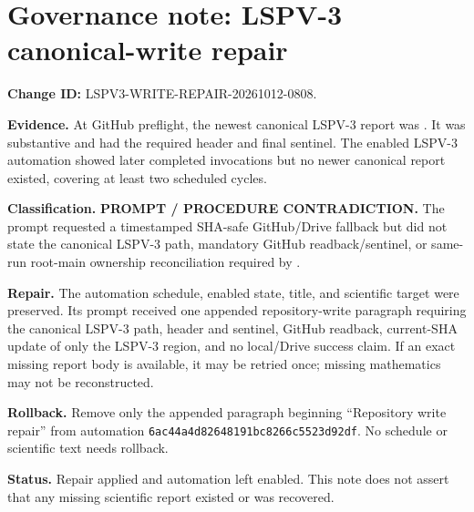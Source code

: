 \documentclass[11pt]{article}
\begin{document}
\section*{Governance note: LSPV-3 canonical-write repair}
\textbf{Change ID:} LSPV3-WRITE-REPAIR-20261012-0808.

\textbf{Evidence.} At GitHub preflight, the newest canonical LSPV-3 report
was .
It was substantive and had the required header and final sentinel.  The
enabled LSPV-3 automation showed later completed invocations but no newer
canonical report existed, covering at least two scheduled cycles.

\textbf{Classification.} \textbf{PROMPT / PROCEDURE CONTRADICTION.}  The
prompt requested a timestamped SHA-safe GitHub/Drive fallback but did not
state the canonical LSPV-3 path, mandatory GitHub readback/sentinel, or
same-run root-main ownership reconciliation required by .

\textbf{Repair.} The automation schedule, enabled state, title, and
scientific target were preserved.  Its prompt received one appended
repository-write paragraph requiring the canonical LSPV-3 path, header and
sentinel, GitHub readback, current-SHA update of only the LSPV-3 region, and
no local/Drive success claim.  If an exact missing report body is available,
it may be retried once; missing mathematics may not be reconstructed.

\textbf{Rollback.} Remove only the appended paragraph beginning
``Repository write repair'' from automation
\texttt{6ac44a4d82648191bc8266c5523d92df}.  No schedule or scientific text
needs rollback.

\textbf{Status.} Repair applied and automation left enabled.  This note does
not assert that any missing scientific report existed or was recovered.

\end{document}
